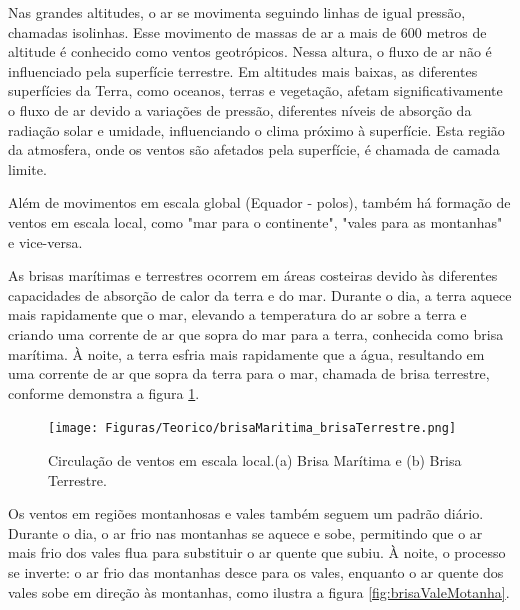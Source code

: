 
\par Nas grandes altitudes, o ar se movimenta seguindo linhas de igual pressão, chamadas isolinhas. Esse movimento de massas de ar a mais de 600 metros de altitude é conhecido como ventos geotrópicos. Nessa altura, o fluxo de ar não é influenciado pela superfície terrestre. Em altitudes mais baixas, as diferentes superfícies da Terra, como oceanos, terras e vegetação, afetam significativamente o fluxo de ar devido a variações de pressão, diferentes níveis de absorção da radiação solar e umidade, influenciando o clima próximo à superfície. Esta região da atmosfera, onde os ventos são afetados pela superfície, é chamada de camada limite.

\par Além de movimentos em escala global (Equador - polos), também há formação de ventos em escala local, como "mar para o continente", "vales para as montanhas" e vice-versa.

\par As brisas marítimas e terrestres ocorrem em áreas costeiras devido às diferentes capacidades de absorção de calor da terra e do mar. Durante o dia, a terra aquece mais rapidamente que o mar, elevando a temperatura do ar sobre a terra e criando uma corrente de ar que sopra do mar para a terra, conhecida como brisa marítima. À noite, a terra esfria mais rapidamente que a água, resultando em uma corrente de ar que sopra da terra para o mar, chamada de brisa terrestre, conforme demonstra a figura \ref{fig:brisaTerrestreMaritima}.

\begin{figure}[H]
    \caption{Circulação de ventos em escala local.(a) Brisa Marítima e (b) Brisa Terrestre. }
    \label{fig:brisaTerrestreMaritima}
    \centering
    \texttt{[image: Figuras/Teorico/brisaMaritima\_brisaTerrestre.png]}
\end{figure}

\par Os ventos em regiões montanhosas e vales também seguem um padrão diário. Durante o dia, o ar frio nas montanhas se aquece e sobe, permitindo que o ar mais frio dos vales flua para substituir o ar quente que subiu. À noite, o processo se inverte: o ar frio das montanhas desce para os vales, enquanto o ar quente dos vales sobe em direção às montanhas, como ilustra a figura \ref{fig:brisaValeMotanha}. 

